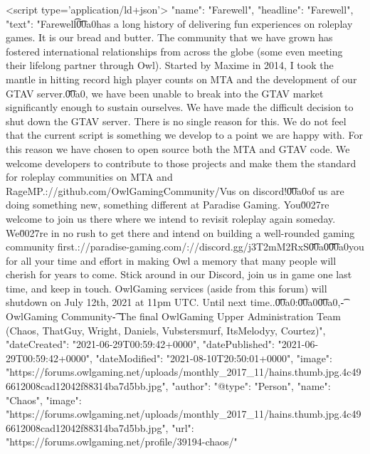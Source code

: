 <script type='application/ld+json'>
{
    "name": "Farewell",
    "headline": "Farewell",
    "text": "Farewell\n\t \n\n\n\n\t\u00a0\n \n\n\n\tOwlGaming has a long history of delivering fun experiences on roleplay games. It is our bread and butter. The community that we have grown has fostered international relationships from across the globe (some even meeting their lifelong partner through Owl). Started by Maxime in 2014, I took the mantle in hitting record high player counts on MTA and the development of our GTAV server.\n \n\n\n\t\u00a0\n \n\n\n\tUnfortunately, we have been unable to break into the GTAV market significantly enough to sustain ourselves. We have made the difficult decision to shut down the GTAV server. There is no single reason for this. We do not feel that the current script is something we develop to a point we are happy with. For this reason we have chosen to open source both the MTA and GTAV code. We welcome developers to contribute to those projects and make them the standard for roleplay communities on MTA and RageMP.\n \n\n\n\thttps://github.com/OwlGamingCommunity/V\n \n\n\n\tJoin us on discord!\n \n\n\n\t\u00a0\n \n\n\n\tSome of us are doing something new, something different at Paradise Gaming. You\u0027re welcome to join us there where we intend to revisit roleplay again someday. We\u0027re in no rush to get there and intend on building a well-rounded gaming community first.\n \n\n\n\thttps://paradise-gaming.com/\n \n\n\n\thttps://discord.gg/j3T2mM2RxS\n \n\n\n\t\u00a0\n \n\n\n\t \n\n\n\t\u00a0\n \n\n\n\tThank you for all your time and effort in making Owl a memory that many people will cherish for years to come. Stick around in our Discord, join us in game one last time, and keep in touch. OwlGaming services (aside from this forum) will shutdown on July 12th, 2021 at 11pm UTC. Until next time..\n \n\n\n\t\u00a0\n \n\n\n\tStats:\n \n\n\n\t\u00a0\n \n\n\n\n\n\t\u00a0\n \n\n\n\tRegards,\n \n\n\n\t- OwlGaming Community\n \n\n\n\t- The final OwlGaming Upper Administration Team (Chaos, ThatGuy, Wright, Daniels, Vubstersmurf, ItsMelodyy, Courtez)\n \n",
    "dateCreated": "2021-06-29T00:59:42+0000",
    "datePublished": "2021-06-29T00:59:42+0000",
    "dateModified": "2021-08-10T20:50:01+0000",
    "image": "https://forums.owlgaming.net/uploads/monthly_2017_11/hains.thumb.jpg.4c496612008cad12042f88314ba7d5bb.jpg",
    "author": {
        "@type": "Person",
        "name": "Chaos",
        "image": "https://forums.owlgaming.net/uploads/monthly_2017_11/hains.thumb.jpg.4c496612008cad12042f88314ba7d5bb.jpg",
        "url": "https://forums.owlgaming.net/profile/39194-chaos/"
}}

